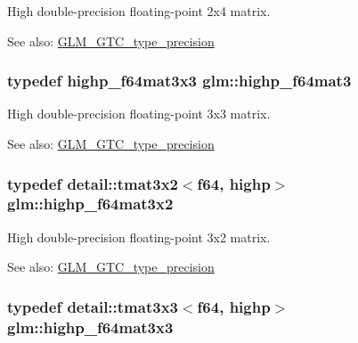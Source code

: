 High double-precision floating-point 2x4 matrix. \begin{Desc}
\item[See also:]\hyperlink{group__gtc__type__precision}{GLM\_\-GTC\_\-type\_\-precision} \end{Desc}
\hypertarget{group__gtc__type__precision_g00c5743b0eba6b437422571f4eda27b8}{
\subsubsection[highp\_\-f64mat3]{\setlength{\rightskip}{0pt plus 5cm}typedef highp\_\-f64mat3x3 {\bf glm::highp\_\-f64mat3}}}
\label{group__gtc__type__precision_g00c5743b0eba6b437422571f4eda27b8}


High double-precision floating-point 3x3 matrix. \begin{Desc}
\item[See also:]\hyperlink{group__gtc__type__precision}{GLM\_\-GTC\_\-type\_\-precision} \end{Desc}
\hypertarget{group__gtc__type__precision_g5cdc9d6fb9ce07e5485c4e2db919ce7e}{
\subsubsection[highp\_\-f64mat3x2]{\setlength{\rightskip}{0pt plus 5cm}typedef detail::tmat3x2$<$f64, highp$>$ {\bf glm::highp\_\-f64mat3x2}}}
\label{group__gtc__type__precision_g5cdc9d6fb9ce07e5485c4e2db919ce7e}


High double-precision floating-point 3x2 matrix. \begin{Desc}
\item[See also:]\hyperlink{group__gtc__type__precision}{GLM\_\-GTC\_\-type\_\-precision} \end{Desc}
\hypertarget{group__gtc__type__precision_gf520a9307867c632408029a53af3e375}{
\subsubsection[highp\_\-f64mat3x3]{\setlength{\rightskip}{0pt plus 5cm}typedef detail::tmat3x3$<$f64, highp$>$ {\bf glm::highp\_\-f64mat3x3}}}
\label{group__gtc__type__precision_gf520a9307867c632408029a53af3e375}


